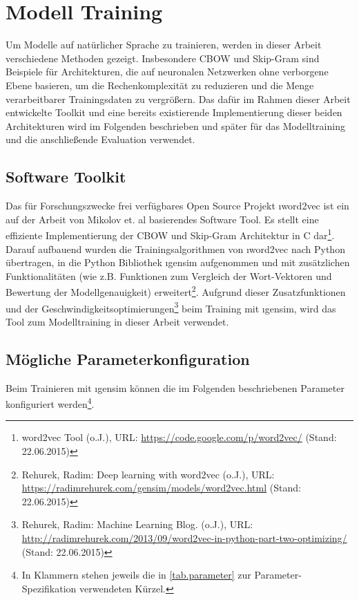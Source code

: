 \section{Modell Training}\label{s.modelltraining}
Um Modelle auf natürlicher Sprache zu trainieren, werden in dieser Arbeit verschiedene Methoden gezeigt. Insbesondere CBOW und Skip-Gram sind Beispiele für Architekturen, die auf neuronalen Netzwerken ohne verborgene Ebene basieren, um die Rechenkomplexität zu reduzieren und die Menge verarbeitbarer Trainingsdaten zu vergrößern. Das dafür im Rahmen dieser Arbeit entwickelte Toolkit und eine bereits existierende Implementierung dieser beiden Architekturen wird im Folgenden beschrieben und später für das Modelltraining und die anschließende Evaluation verwendet.

\subsection{Software Toolkit}\label{ss.softwaretoolkit}
Das für Forschungszwecke frei verfügbares Open Source Projekt \i{word2vec} ist ein auf der Arbeit von Mikolov et. al \citep{Mikolov2013} basierendes Software Tool. Es stellt eine effiziente Implementierung der CBOW und Skip-Gram Architektur in C dar\footnote{word2vec Tool (o.J.), URL: \url{https://code.google.com/p/word2vec/} (Stand: 22.06.2015)}. Darauf aufbauend wurden die Trainingsalgorithmen von \i{word2vec} nach Python übertragen, in die Python Bibliothek \i{gensim} aufgenommen und mit zusätzlichen Funktionalitäten (wie z.B. Funktionen zum Vergleich der Wort-Vektoren und Bewertung der Modellgenauigkeit) erweitert\footnote{Rehurek, Radim: Deep learning with word2vec (o.J.), URL: \url{https://radimrehurek.com/gensim/models/word2vec.html} (Stand: 22.06.2015)}. Aufgrund dieser Zusatzfunktionen und der Geschwindigkeitsoptimierungen\footnote{Rehurek, Radim: Machine Learning Blog. (o.J.), URL: \url{http://radimrehurek.com/2013/09/word2vec-in-python-part-two-optimizing/} (Stand: 22.06.2015)} beim Training mit \i{gensim}, wird das Tool zum Modelltraining in dieser Arbeit verwendet.

\subsection{Mögliche Parameterkonfiguration}\label{ss.parameter}
Beim Trainieren mit \i{gensim} können die im Folgenden beschriebenen Parameter konfiguriert werden\footnote{In Klammern stehen jeweils die in \autoref{tab.parameter} zur Parameter-Spezifikation verwendeten Kürzel.}.

